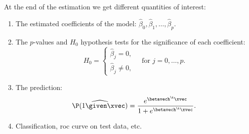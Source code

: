At the end of the estimation we get different quantities of interest:
\begin{enumerate}
    \item The estimated coefficients of the model: $\hat{\beta}_0, \hat{\beta}_1, \ldots, \hat{\beta}_p$.
    \item The $p$-values and $H_0$ hypothesis tests for the significance of each coefficient:
    \begin{equation}
        H_0 = \begin{cases}
            \hat{\beta}_j = 0,\\
            \hat{\beta}_j \neq 0,
        \end{cases}\quad \text{for } j = 0, \ldots, p.
    \end{equation}
    \item The prediction:
    \begin{equation}
        \widehat{\P(1 \given \xvec)} = \frac{e^{\betavech^\t \xvec}}{1 + e^{\betavech^\t \xvec}}.
    \end{equation}
    \item Classification, \acs{roc} curve on test data, etc.
\end{enumerate}